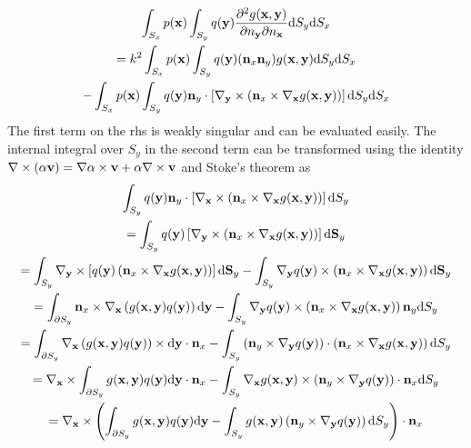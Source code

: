 \documentclass{article}
\newcommand{\td}{\mathrm{d}}
\begin{document}
\begin{multline}
\int_{S_x} p({\bf x}) \int_{S_y}
q({\bf y})
\frac{\partial^2 g({\bf x},{\bf y})}{\partial n_{\bf y}\partial n_{\bf x}}
\td S_y \td S_x
\\
= k^2 \int_{S_x} p({\bf x}) \int_{S_y}
q({\bf y})
({\bf n}_x {\bf n}_y) g({\bf x},{\bf y})
\td S_y \td S_x
\\
-\int_{S_x} p({\bf x})
\int_{S_y}
q({\bf y})
{\bf n}_y \cdot \left[\nabla_{\bf y} \times \left({\bf n}_x\times \nabla_{\bf x}g({\bf x}, {\bf y})\right)\right]
\td S_y \td S_x
\end{multline}
%
The first term on the rhs is weakly singular and can be evaluated easily.
The internal integral over $S_y$ in the second term can be transformed using the identity $\nabla \times (\alpha {\bf v}) = \nabla \alpha \times {\bf v} + \alpha \nabla \times {\bf v}$ and Stoke's theorem as
%
\begin{multline}
\int_{S_y} q({\bf y})
{\bf n}_y \cdot \left[\nabla_{\bf x} \times \left({\bf n}_x\times \nabla_{\bf x}g({\bf x}, {\bf y})\right)\right]
\td S_y \\
= \int_{S_y} q({\bf y})
\left[\nabla_{\bf y} \times \left({\bf n}_x\times \nabla_{\bf x}g({\bf x}, {\bf y})\right)\right]
\td {\bf S}_y \\
= \int_{S_y} \nabla_{\bf y} \times \left[
q({\bf y}) \left({\bf n}_x\times \nabla_{\bf x}g({\bf x}, {\bf y})\right)\right]
\td {\bf S}_y 
-
\int_{S_y} \nabla_{\bf y} q({\bf y}) \times 
\left({\bf n}_x\times \nabla_{\bf x}g({\bf x}, {\bf y})\right)
\td {\bf S}_y
\\
= \int_{\partial S_y} 
{\bf n}_x\times \nabla_{\bf x}\left(g({\bf x}, {\bf y}) q({\bf y})\right)
\td {\bf y}
-
\int_{S_y} \nabla_{\bf y} q({\bf y}) \times 
\left({\bf n}_x\times \nabla_{\bf x}g({\bf x}, {\bf y})\right)
{\bf n}_y \td S_y
\\
= \int_{\partial S_y} 
 \nabla_{\bf x}\left(g({\bf x}, {\bf y}) q({\bf y})\right)
\times \td {\bf y} \cdot {\bf n}_x
-
\int_{S_y} \left({\bf n}_y  \times \nabla_{\bf y} q({\bf y}) \right) \cdot
\left({\bf n}_x\times \nabla_{\bf x}g({\bf x}, {\bf y})\right)
\td S_y
\\
= \nabla_{\bf x} \times \int_{\partial S_y} 
g({\bf x}, {\bf y}) q({\bf y})
\td {\bf y} \cdot {\bf n}_x
-
\int_{S_y} \nabla_{\bf x}g({\bf x}, {\bf y}) \times \left({\bf n}_y  \times \nabla_{\bf y} q({\bf y}) \right) \cdot
{\bf n}_x
\td S_y
\\
= \nabla_{\bf x} \times
\left(\int_{\partial S_y} 
g({\bf x}, {\bf y}) q({\bf y})
\td {\bf y} 
-
\int_{S_y} g({\bf x}, {\bf y}) \left({\bf n}_y  \times \nabla_{\bf y} q({\bf y}) \right)
\td S_y
\right)
\cdot {\bf n}_x
\end{multline}
\end{document}
